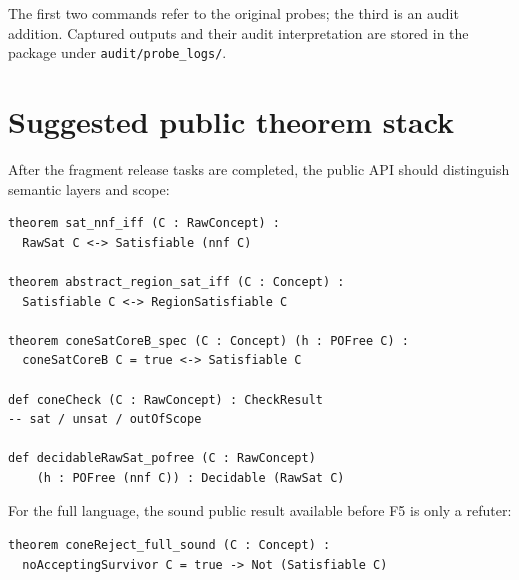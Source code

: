 \documentclass[11pt]{article}
\newcommand{\code}[1]{\texttt{#1}}
\begin{document}
The first two commands refer to the original probes; the third is an audit addition.
Captured outputs and their audit interpretation are stored in the package under
\code{audit/probe\_logs/}.

\section{Suggested public theorem stack}

After the fragment release tasks are completed, the public API should distinguish
semantic layers and scope:
\begin{lstlisting}
theorem sat_nnf_iff (C : RawConcept) :
  RawSat C <-> Satisfiable (nnf C)

theorem abstract_region_sat_iff (C : Concept) :
  Satisfiable C <-> RegionSatisfiable C

theorem coneSatCoreB_spec (C : Concept) (h : POFree C) :
  coneSatCoreB C = true <-> Satisfiable C

def coneCheck (C : RawConcept) : CheckResult
-- sat / unsat / outOfScope

def decidableRawSat_pofree (C : RawConcept)
    (h : POFree (nnf C)) : Decidable (RawSat C)
\end{lstlisting}

For the full language, the sound public result available before F5 is only a refuter:
\begin{lstlisting}
theorem coneReject_full_sound (C : Concept) :
  noAcceptingSurvivor C = true -> Not (Satisfiable C)
\end{lstlisting}
\end{document}
